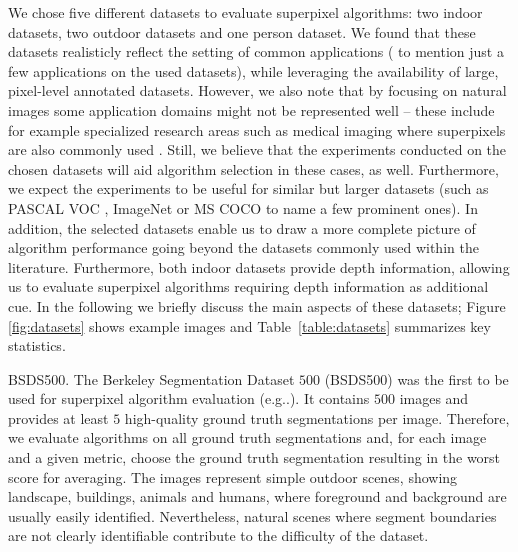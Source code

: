 \documentclass[5p]{elsarticle}
\makeatletter
\DeclareRobustCommand\onedot{\futurelet\@let@token\@onedot}
\def\@onedot{\ifx\@let@token.\else.\null\fi\xspace}
\def\eg{{e.g}\onedot} \def\Eg{{E.g}\onedot}
\def\BSDS{BSDS500\xspace}
\makeatother
\begin{document}
We chose five different datasets to evaluate superpixel algorithms: two indoor datasets,
two outdoor datasets and one person dataset. We found that these datasets
realisticly reflect the setting of common applications (\cite{YamaguchiKiapourOrtizBerg:2012,LinFidlerUrtasun:2013,
LermaKosecka:2014,LiuSalzmannHe:2014,ArbelaezPontTusetBarronMarquesMalik:2014,GeigerWang:2015,
HeLauLiuHuangYang:2015,GuptaArbelaezGirshickMalik:2015} to mention just a few 
applications on the used datasets), while leveraging the
availability of large, pixel-level annotated datasets. 
However, we also note that by focusing on natural images some application domains might not be represented well
 -- these include for example specialized research areas such as medical imaging where superpixels are also commonly used
\cite{AndresKotheHelmstaedterDenkHamprecht:2008,LucchiSmithAchantaLepetitFua:2010,HaasDonnerBurnerHolzerLangs:2011,LucchiSmithAchantaKnottFua:2012}.
Still, we believe that the experiments conducted on the
chosen datasets will aid algorithm selection in these cases, as well. Furthermore, we expect the experiments
to be useful for similar but larger datasets (such as PASCAL VOC \cite{EveringhamVanGoolWilliamsWinnZisserman:2007}, 
ImageNet \cite{DengDongSocherLiLiFeiFei:2009} or
MS COCO \cite{LinMairebelongieBourdevGirshickHaysPeronaRamananDollarZitnick:2014} to name a few prominent ones).
In addition, the selected datasets enable
us to draw a more complete picture of algorithm performance going beyond the
datasets commonly used within the literature.
Furthermore, both indoor datasets provide depth information, allowing us to evaluate superpixel algorithms
requiring depth information as additional cue. In the following we briefly discuss the
main aspects of these datasets; Figure \ref{fig:datasets} shows example
images and Table~\ref{table:datasets} summarizes key statistics.

{\BSDS \cite{ArbelaezMaireFowlkesMalik:2011}.} The Berkeley Segmentation
Dataset $500$ (\BSDS) was the first to be used for superpixel algorithm evaluation
(\eg \cite{RenMalik:2003,LevinshteinStereKutulakosFleetDickinsonSiddiqi:2009}).
It contains $500$ images and provides at least $5$ high-quality ground truth segmentations
per image. Therefore, we evaluate algorithms on all ground truth segmentations and,
for each image and a given metric, choose the ground truth segmentation resulting 
in the worst score for averaging. The images
represent simple outdoor scenes, showing landscape, buildings, animals and humans,
where foreground and background are usually easily identified. Nevertheless, natural
scenes where segment boundaries are not clearly identifiable contribute to the difficulty of the dataset.
\end{document}
